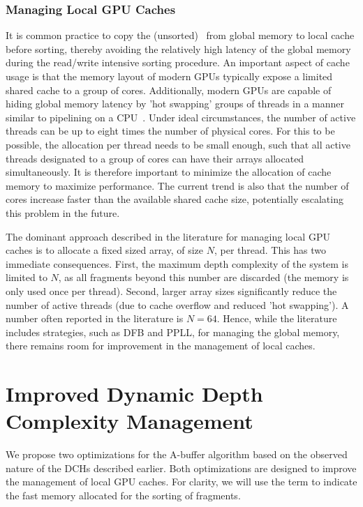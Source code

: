 \documentclass{egpubl}
\newcommand{\ab}{\mbox{A-buffer}}
\newcommand{\dchs}{DCHs}
\begin{document}
\subsubsection*{Managing Local GPU Caches}

It is common practice to copy the (unsorted) \bFraglist\ from global memory to local cache before sorting, thereby avoiding the relatively high latency of the global memory during the read/write intensive sorting procedure. 
An important aspect of cache usage is that the memory layout of modern GPUs typically expose a limited shared cache to a group of cores. 
Additionally, modern GPUs are capable of hiding global memory latency by 'hot swapping' groups of threads in a manner similar to pipelining on a CPU~\cite{Nvidia2011}. 
Under ideal circumstances, the number of active threads can be up to eight times the number of physical cores. 
For this to be possible, the allocation per thread needs to be small enough, such that all active threads designated to a group of cores can have their arrays allocated simultaneously. 
It is therefore important to minimize the allocation of cache memory to maximize performance. 
The current trend is also that the number of cores increase faster than the available shared cache size, potentially escalating this problem in the future. 

The dominant approach described in the literature for managing local GPU caches is to allocate a fixed sized array, of size $N$, per thread. 
This has two immediate consequences. 
First, the maximum depth complexity of the system is limited to $N$, as all fragments beyond this number are discarded (the memory is only used once per thread). 
Second, larger array sizes significantly reduce the number of active threads (due to cache overflow and reduced 'hot swapping'). 
A number often reported in the literature is $N=64$. 
Hence, while the literature includes strategies, such as DFB and PPLL, for managing the global memory, there remains room for improvement in the management of local caches.


\section{Improved Dynamic Depth Complexity Management}
\label{sec:oit-local}

We propose two optimizations for the \ab{} algorithm based on the observed nature of the \dchs{} described earlier. 
Both optimizations are designed to improve the management of local GPU caches. 
For clarity, we will use the term \bArray{} to indicate the fast memory allocated for the sorting of fragments. 
\end{document}
